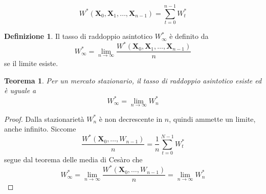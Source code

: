 \documentclass[a4paper,11pt]{book}
\theoremstyle{plain}
\newtheorem{teo}{Teorema}[chapter]
\theoremstyle{definition}
\newtheorem{defn}{Definizione}[chapter]
\theoremstyle{remark}
\newcommand{\X}{\bm{X}}
\begin{document}
\begin{equation*}
	W^*(\X_0,\X_1,\ldots,\X_{n-1})=\sum_{t = 0}^{n-1}{W^*_t} 
\end{equation*}
\begin{defn}
	Il tasso di raddoppio asintotico $W^*_\infty$ è definito da
	\begin{equation*}
		W^*_\infty=\lim\limits_{n\to \infty}\frac{W^*(\X_0,\X_1,\ldots,\X_{n-1})}{n}
	\end{equation*}
	se il limite esiste.
\end{defn}
\begin{teo}
	Per un mercato stazionario, il tasso di raddoppio asintotico esiste ed è uguale a 
	\begin{equation*}
		W^*_\infty=\lim\limits_{n\to\infty}W^*_n
	\end{equation*}
\end{teo}
\begin{proof}
	Dalla stazionarietà $W^*_n$ è non decrescente in $n$, quindi ammette un limite, anche infinito. Siccome
	\begin{equation*}
		\frac{W^*(\X_0,\ldots, W_{n-1})}{n} = \frac{1}{n}\sum_{t = 0}^{N-1}{W^*_t}
	\end{equation*}
	segue dal teorema delle media di Cesàro che
	\begin{equation*}
		W^*_\infty=\lim\limits_{n\to\infty}\frac{W^*(\X_0,\ldots, W_{n-1})}{n} =\lim\limits_{n\to\infty}W^*_n
	\end{equation*}
\end{proof}
\end{document}

